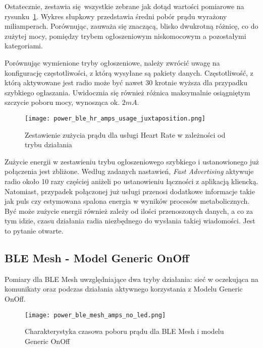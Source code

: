 Ostatecznie, zestawia się wszystkie zebrane jak dotąd wartości pomiarowe na rysunku~\ref{rys:power_ble_hr_amps_usage_juxtaposition}.
Wykres słupkowy przedstawia średni pobór prądu wyrażony miliamperach. Porównując, zauważa się znaczącą, blisko dwukrotną
różnicę, co do zużytej mocy, pomiędzy trybem ogłoszeniowym niskomocowym a pozostałymi kategoriami.

Porównując wymienione tryby ogłoszeniowe, należy zwrócić uwagę na konfigurację częstotliwości, z którą wysyłane są
pakiety danych. Częstotliwość, z którą aktywowane jest radio może być nawet 30 krotnie wyższa dla przypadku szybkiego ogłaszania.
Uwidocznia się również różnica maksymalnie osiągniętym szczycie poboru mocy, wynosząca ok. $2mA$.

\begin{figure}[!htb]
	\centering \texttt{[image: power\_ble\_hr\_amps\_usage\_juxtaposition.png]}
	\caption{Zestawienie zużycia prądu dla usługi Heart Rate w zależności od trybu działania}
	\label{rys:power_ble_hr_amps_usage_juxtaposition}
\end{figure}

Zużycie energii w zestawieniu trybu ogłoszeniowego szybkiego i ustanowionego już połączenia jest zbliżone. Według zadanych nastawień,
\textit{Fast Advertising} aktywuje radio około 10 razy częściej aniżeli po ustanowieniu łączności z aplikacją kliencką. Natomiast,
przypadek połączonej już usługi przenosi dodatkowe informacje takie jak puls czy estymowana spalona energia w wyników procesów
metabolicznych. Być może zużycie energii również zależy od ilości przenoszonych danych, a co za tym idzie, czasu działania radia
niezbędnego do wysłania takiej wiadomości. Jest to pytanie otwarte.

\subsection{BLE Mesh - Model Generic OnOff}

Pomiary dla BLE Mesh uwzględniające dwa tryby działania: sieć w oczekująca na komunikaty oraz podczas działania aktywnego korzystania z Modelu Generic OnOff.

\begin{figure}[!htb]
	\centering \texttt{[image: power\_ble\_mesh\_amps\_no\_led.png]} 
	\caption{Charakterystyka czasowa poboru prądu dla BLE Mesh i modelu Generic OnOff}
	\label{rys:power_ble_mesh_amps}
\end{figure}

